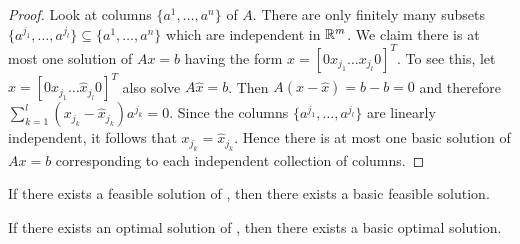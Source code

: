 \begin{proof}
Look at columns $\{ a^1,\dots, a^n \}$ of $A$.
There are only finitely many subsets $\{ a^{j_1},\dots, a^{j_l} \} \subseteq \{ a^1,\dots, a^n \}$ which are independent in $\mathbb{R}^m$.
We claim there is at most one solution of $Ax=b$ having the form $x = [0 x_{j_1} \dots x_{j_l} 0]^T$.
To see this, let $\hat{x} = [0 \hat{x}_{j_1} \dots \hat{x}_{j_l} 0]^T$ also solve $A\hat{x} = b$.
Then $A(x-\hat{x}) = b -b = 0$ and therefore $\sum_{k=1}^{l} (x_{j_k} - \hat{x}_{j_k})a^{j_k} = 0$.
Since the columns $\{ a^{j_1},\dots, a^{j_l} \}$ are linearly independent, it follows that $x_{j_k} = \hat{x}_{j_k}$.
Hence there is at most one basic solution of $Ax = b$ corresponding to each
independent collection of columns.
\end{proof}

\begin{theorem}
If there exists a feasible solution of , then there exists a basic feasible solution.

If there exists an optimal solution of , then there exists a basic optimal solution. 
\end{theorem}

